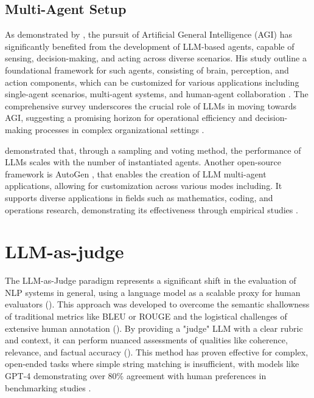         \subsection{Multi-Agent Setup} 
            As demonstrated by \citet{xi2023rise}, the pursuit of Artificial General Intelligence (AGI) has significantly benefited from the development of LLM-based agents, capable of sensing, decision-making, and acting across diverse scenarios.  
            His study outline a foundational framework for such agents, consisting of brain, perception, and action components, which can be customized for various applications including single-agent scenarios, multi-agent systems, and human-agent collaboration . 
            The comprehensive survey underscores the crucial role of LLMs in moving towards AGI, suggesting a promising horizon for operational efficiency and decision-making processes in complex organizational settings \citep{xi2023rise}.

            \citet{Li2024} demonstrated that, through a sampling and voting method, the performance of LLMs scales with the number of instantiated agents.
            Another open-source framework is AutoGen \citep{Wu2023}, that enables the creation of LLM multi-agent applications, allowing for customization across various modes including. It supports diverse applications in fields such as mathematics, coding, and operations research, demonstrating its effectiveness through empirical studies \citep{Wu2023}.

        \section{LLM-as-judge}


            The LLM-as-Judge paradigm represents a significant shift in the evaluation of NLP systems in general, using a language model as a scalable proxy for human evaluators (\citep{li2024llmsasjudgescomprehensivesurveyllmbased}). 
            This approach was developed to overcome the semantic shallowness of traditional metrics like BLEU or ROUGE and the logistical challenges of extensive human annotation (\citep{Zheng2023}). 
            By providing a "judge" LLM with a clear rubric and context, it can perform nuanced assessments of qualities like coherence, relevance, and factual accuracy (\citep{li2024llmsasjudgescomprehensivesurveyllmbased}).
            This method has proven effective for complex, open-ended tasks where simple string matching is insufficient, with models like GPT-4 demonstrating over 80\% agreement with human preferences in benchmarking studies \citep{Zheng2023}.

